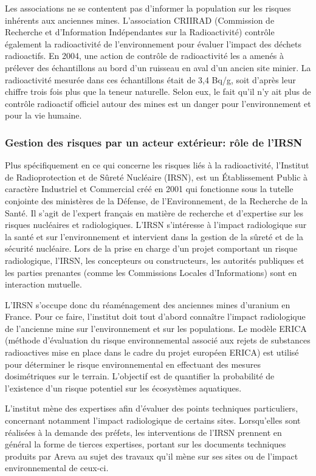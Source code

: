 \documentclass{article}
\begin{document}
Les associations ne se contentent pas d’informer la population sur les risques inhérents aux anciennes mines. L’association CRIIRAD (Commission de Recherche et d’Information Indépendantes sur la Radioactivité)  contrôle également la radioactivité de l’environnement pour évaluer l’impact des déchets radioactifs. En 2004, une action de contrôle de radioactivité les a amenés à prélever des échantillons au bord d’un ruisseau en aval d’un ancien site minier. La radioactivité mesurée dans ces échantillons était de 3,4 Bq/g, soit d’après leur chiffre trois fois plus que la teneur naturelle. Selon eux, le fait qu’il n’y ait plus de contrôle radioactif officiel autour des mines est un danger pour l’environnement et pour la vie humaine. 


\subsubsection{Gestion des risques par un acteur extérieur: rôle de l’IRSN}
Plus spécifiquement en ce qui concerne les risques liés à la radioactivité, l'Institut de Radioprotection et de Sûreté Nucléaire (IRSN), est un Établissement Public à caractère Industriel et Commercial créé en 2001 qui fonctionne sous la tutelle conjointe des ministères de la Défense, de l’Environnement, de la Recherche de la Santé. Il s’agit de l’expert français en matière de recherche et d’expertise sur les risques nucléaires et radiologiques. L’IRSN s’intéresse à l’impact radiologique sur la santé et sur l'environnement et intervient dans la gestion de la sûreté et de la sécurité nucléaire.  Lors de la prise en charge d’un projet comportant un risque radiologique, l’IRSN, les concepteurs ou constructeurs, les autorités publiques et les parties prenantes (comme les Commissions Locales d’Informations) sont en interaction mutuelle.

L’IRSN s’occupe donc  du réaménagement des anciennes mines d’uranium en France. Pour ce faire, l’institut doit tout d’abord connaître l’impact radiologique de l’ancienne mine sur l’environnement et sur les populations. Le modèle ERICA (méthode d’évaluation du risque environnemental associé aux rejets de substances radioactives mise en place dans le cadre du projet européen ERICA) est utilisé pour déterminer  le risque environnemental en effectuant des mesures dosimétriques sur le terrain. L’objectif est de quantifier la probabilité de l’existence d’un risque potentiel sur les écosystèmes aquatiques.

L’institut  mène  des  expertises  afin  d’évaluer  des  points  techniques  particuliers,  concernant notamment l’impact radiologique de certains sites. Lorsqu’elles sont réalisées à la demande des préfets, les interventions de l’IRSN prennent en général la forme de tierces expertises, portant sur les documents techniques produits par Areva au sujet des travaux qu’il mène sur  ses  sites  ou  de  l’impact  environnemental  de  ceux-ci.
\end{document}
